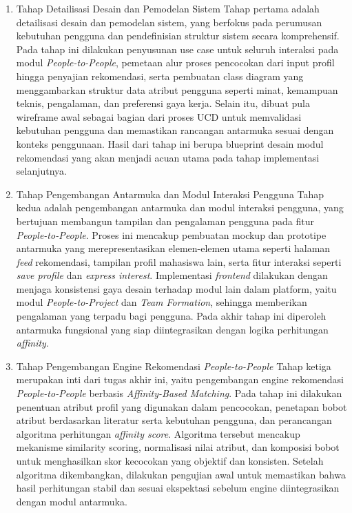 \begin{enumerate}
\item {Tahap Detailisasi Desain dan Pemodelan Sistem} 
Tahap pertama adalah detailisasi desain dan pemodelan sistem, yang berfokus pada perumusan kebutuhan pengguna dan pendefinisian struktur sistem secara komprehensif. Pada tahap ini dilakukan penyusunan use case untuk seluruh interaksi pada modul \textit{People-to-People}, pemetaan alur proses pencocokan dari input profil hingga penyajian rekomendasi, serta pembuatan class diagram yang menggambarkan struktur data atribut pengguna seperti minat, kemampuan teknis, pengalaman, dan preferensi gaya kerja. Selain itu, dibuat pula wireframe awal sebagai bagian dari proses UCD untuk memvalidasi kebutuhan pengguna dan memastikan rancangan antarmuka sesuai dengan konteks penggunaan. Hasil dari tahap ini berupa blueprint desain modul rekomendasi yang akan menjadi acuan utama pada tahap implementasi selanjutnya.

\item {Tahap Pengembangan Antarmuka dan Modul Interaksi Pengguna}
Tahap kedua adalah pengembangan antarmuka dan modul interaksi pengguna, yang bertujuan membangun tampilan dan pengalaman pengguna pada fitur \textit{People-to-People}. Proses ini mencakup pembuatan mockup dan prototipe antarmuka yang merepresentasikan elemen-elemen utama seperti halaman \textit{feed} rekomendasi, tampilan profil mahasiswa lain, serta fitur interaksi seperti \textit{save profile} dan \textit{express interest}. Implementasi \textit{frontend} dilakukan dengan menjaga konsistensi gaya desain terhadap modul lain dalam platform, yaitu modul \textit{People-to-Project} dan \textit{Team Formation}, sehingga memberikan pengalaman yang terpadu bagi pengguna. Pada akhir tahap ini diperoleh antarmuka fungsional yang siap diintegrasikan dengan logika perhitungan \textit{affinity}.

\item {Tahap Pengembangan Engine Rekomendasi \textit{People-to-People}}
Tahap ketiga merupakan inti dari tugas akhir ini, yaitu pengembangan engine rekomendasi \textit{People-to-People} berbasis \textit{Affinity-Based Matching}. Pada tahap ini dilakukan penentuan atribut profil yang digunakan dalam pencocokan, penetapan bobot atribut berdasarkan literatur serta kebutuhan pengguna, dan perancangan algoritma perhitungan \textit{affinity score}. Algoritma tersebut mencakup mekanisme similarity scoring, normalisasi nilai atribut, dan komposisi bobot untuk menghasilkan skor kecocokan yang objektif dan konsisten. Setelah algoritma dikembangkan, dilakukan pengujian awal untuk memastikan bahwa hasil perhitungan stabil dan sesuai ekspektasi sebelum engine diintegrasikan dengan modul antarmuka.


\end{enumerate}
